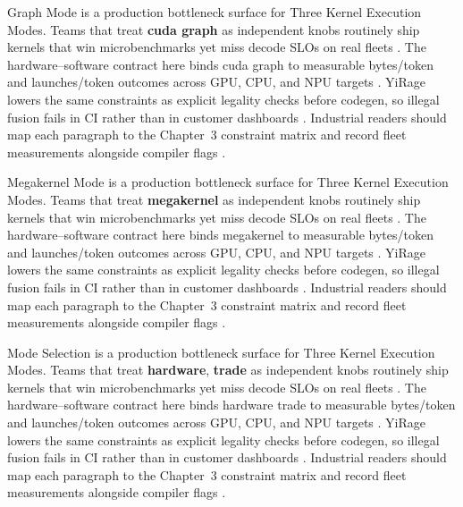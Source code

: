 Graph Mode is a production bottleneck surface for Three Kernel Execution Modes. Teams that treat \textbf{cuda graph} as independent knobs routinely ship kernels that win microbenchmarks yet miss decode SLOs on real fleets \citep{amd2024xdna,dao2022flashattention}. The hardware--software contract here binds cuda graph to measurable bytes/token and launches/token outcomes across GPU, CPU, and NPU targets \citep{amd2024aie,kwon2023vllm}. YiRage lowers the same constraints as explicit legality checks before codegen, so illegal fusion fails in CI rather than in customer dashboards \citep{dlbook,nvidia2024cudagraphs}. Industrial readers should map each paragraph to the Chapter~3 constraint matrix and record fleet measurements alongside compiler flags \citep{dao2022flashattention,liu2024deepseekv3}.

Megakernel Mode is a production bottleneck surface for Three Kernel Execution Modes. Teams that treat \textbf{megakernel} as independent knobs routinely ship kernels that win microbenchmarks yet miss decode SLOs on real fleets \citep{amd2024aie,kwon2023vllm}. The hardware--software contract here binds megakernel to measurable bytes/token and launches/token outcomes across GPU, CPU, and NPU targets \citep{dlbook,nvidia2024cudagraphs}. YiRage lowers the same constraints as explicit legality checks before codegen, so illegal fusion fails in CI rather than in customer dashboards \citep{dao2022flashattention,liu2024deepseekv3}. Industrial readers should map each paragraph to the Chapter~3 constraint matrix and record fleet measurements alongside compiler flags \citep{kwon2023vllm,patel2025llminference}.

Mode Selection is a production bottleneck surface for Three Kernel Execution Modes. Teams that treat \textbf{hardware}, \textbf{trade} as independent knobs routinely ship kernels that win microbenchmarks yet miss decode SLOs on real fleets \citep{dlbook,nvidia2024cudagraphs}. The hardware--software contract here binds hardware trade to measurable bytes/token and launches/token outcomes across GPU, CPU, and NPU targets \citep{dao2022flashattention,liu2024deepseekv3}. YiRage lowers the same constraints as explicit legality checks before codegen, so illegal fusion fails in CI rather than in customer dashboards \citep{kwon2023vllm,patel2025llminference}. Industrial readers should map each paragraph to the Chapter~3 constraint matrix and record fleet measurements alongside compiler flags \citep{nvidia2024cudagraphs,taxbreak2026}.

